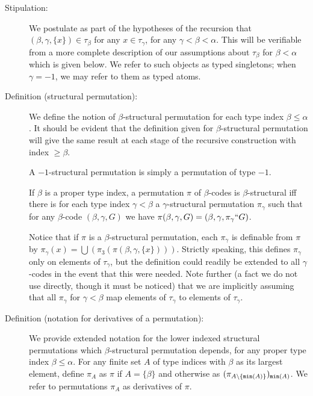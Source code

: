 \documentclass[112pt]{article}
\begin{document}
\begin{description}

\item[Stipulation:]  We postulate as part of the hypotheses of the recursion that $(\beta,\gamma,\{x\}) \in \tau_\beta$ for any $x \in \tau_\gamma$, for any $\gamma<\beta<\alpha$.  This will be verifiable from a more complete description of our assumptions about $\tau_\beta$ for $\beta<\alpha$ which is given below.  We refer to such objects as typed singletons;  when $\gamma=-1$, we may refer to them as typed atoms.

\item[Definition (structural permutation):]  We define the notion of $\beta$-structural permutation for each type index $\beta \leq \alpha$.  It should be evident that the definition given for $\beta$-structural permutation will give the same result at each stage of the recursive construction with index $\geq \beta$.

A $-1$-structural permutation is simply a permutation of type $-1$.

If $\beta$ is a proper type index, a permutation $\pi$ of $\beta$-codes is $\beta$-structural iff there is for each type index $\gamma<\beta$ a
$\gamma$-structural permutation $\pi_\gamma$ such that for any $\beta$-code $(\beta,\gamma,G)$ we have $\pi(\beta,\gamma,G) = (\beta,\gamma,\pi_\gamma``G)$.

Notice that if $\pi$ is a $\beta$-structural permutation, each $\pi_\gamma$ is definable from $\pi$ by $\pi_\gamma(x) = \bigcup(\pi_3(\pi(\beta,\gamma,\{x\})))$.  Strictly speaking, this defines $\pi_\gamma$ only on elements of $\tau_\gamma$, but the definition could readily be extended to all $\gamma$-codes in the event that this were needed.  Note further (a fact we do not use directly, though it must be noticed) that we are implicitly assuming that all $\pi_\gamma$ for $\gamma<\beta$
map elements of $\tau_\gamma$ to elements of $\tau_\gamma$.

\item[Definition (notation for derivatives of a permutation):] We provide extended notation for the lower indexed structural  permutations which  $\beta$-structural permutation depends, for any proper type index $\beta \leq \alpha$.
For any finite set $A$ of type indices with $\beta$ as its largest element, define $\pi_A$ as $\pi$ if $A = \{\beta\}$
and otherwise as $(\pi_{A \setminus \{{\tt min}(A)\}})_{{\tt min}(A)}$.  We refer to permutations $\pi_A$ as derivatives of $\pi$.


\end{description}
\end{document}
